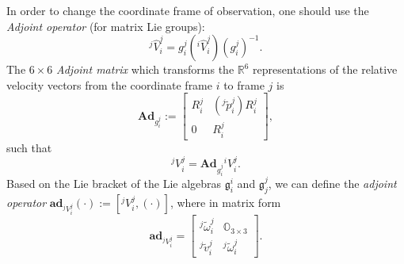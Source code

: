 \documentclass[lettersize,journal]{IEEEtran}
\def \SE {\textbf{SE}(3)}
\def \R  {\mathbb{R}}
\def \g  {\mathfrak{g}}
\def \Ad {\textbf{Ad}}
\theoremstyle{remark}
\begin{document}
In order to change the coordinate frame of observation, one should use the \textit{Adjoint operator} (for matrix Lie groups):
\begin{equation*}
    ^j\hat{V}_i^j={g^j_i}{}(^i\hat{V}_i^ j)({g^j_i})^{-1}.
\end{equation*}
The $6 \times 6$ \textit{Adjoint matrix} which transforms the $\R^6$ representations of the relative velocity vectors from the coordinate frame $i$ to frame $j$ is 
\begin{equation}
    \Ad_{g_i^ j}:=\begin{bmatrix}R_i^ j & (^ j\tilde{p}_i^ j) R_i^ j \\0& R_i^ j\end{bmatrix},
\end{equation}
such that 
\begin{equation}
    ^j{V}_i^j=\Ad_{g^j_i}{}^i{V}_i^j.
    \label{veladj}
\end{equation} 
Based on the Lie bracket of the Lie algebras $\g^i_i$ and $\g^j_j$, we can define the \textit{adjoint operator} $\textbf{ad}_{{}^jV^j_i}(\cdot):=[{^jV^j_i},(\cdot)]$,
where in matrix form
\begin{equation}
\textbf{ad}_{{}^jV^j_i}=\begin{bmatrix}^j\tilde{\omega}_i^{j} & \mathbb{O}_{3\times 3}\\^j\tilde{v}_i^{j} & ^j\tilde{\omega}_i^{j}\end{bmatrix}.
\label{adjlow}
\end{equation}
\end{document}
